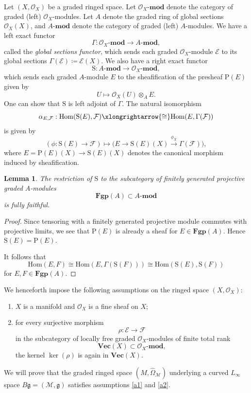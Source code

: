 \documentclass[12pt]{amsart}
\newtheorem{lem}[defn]{Lemma}
\numberwithin{equation}{section}
\theoremstyle{plain}
\newcommand{\fg}{\mathfrak{g}}
\newcommand{\sE}{\mathcal{E}}
\newcommand{\sF}{\mathcal{F}}
\newcommand{\sM}{\mathcal{M}}
\newcommand{\sO}{\mathcal{O}}
\newcommand{\Hom}{\mathrm{Hom}}
\newcommand{\sh}{\mathrm{S}}
\newcommand{\psh}{\mathrm{P}}
\newcommand{\wOmega}{\widehat{\Omega}}
\begin{document}
	Let $(X, \sO_X)$ be a graded ringed space. Let $\sO_X\text{-}\mathbf{mod}$ denote the category of graded (left) $\sO_X$-modules. Let $A$ denote the graded ring of global sections $\sO_X(X)$, and $A\text{-}\mathbf{mod}$ denote the category of graded (left) $A$-modules. We have a left exact functor
	\[
	\Gamma\colon \sO_X\text{-}\mathbf{mod} \longrightarrow A\text{-}\mathbf{mod},
	\]
	called the \emph{global sections functor}, which sends each graded $\sO_X$-module $\sE$ to its global sections $\Gamma(\sE)\coloneqq\sE(X)$. We also have a right exact functor
	\[
	\sh\colon A\text{-}\mathbf{mod} \longrightarrow \sO_X\text{-}\mathbf{mod},
	\]
	which sends each graded $A$-module $E$ to the sheafification of the presheaf $\psh(E)$ given by
	\[
	U \longmapsto \sO_X(U) \otimes_A E.
	\]
	One can show that $\sh$ is left adjoint of $\Gamma$. The natural isomorphism
	\[
	\alpha_{E,\sF}:
	\Hom(\sh(E),\sF)
	\xlongrightarrow{\cong}
	\Hom(E,\Gamma(\sF))
	\]
	is given by
	\[
	(\phi\colon \sh(E) \rightarrow \sF)\longmapsto \bigl(E \rightarrow \sh(E)(X) \xrightarrow{\phi_X} \Gamma(\sF)\bigr),
	\]
	where $E = \psh(E)(X) \rightarrow \sh(E)(X)$ denotes the canonical morphism induced by sheafification.
	
	\begin{lem}
		The restriction of $\sh$ to the subcategory of finitely generated projective graded $A$-modules 
		\[
		\mathbf{Fgp}(A) \subset A\text{-}\mathbf{mod}
		\]
		is fully faithful.
	\end{lem}
	\begin{proof}
		Since tensoring with a finitely generated projective module commutes with projective limits, we see that $\psh(E)$ is already a sheaf for $E \in \mathbf{Fgp}(A)$. Hence $\sh(E) = \psh(E)$. 
		
		It follows that
		\[
		\Hom(E, F) \cong \Hom(E, \Gamma(\sh(F))) \cong \Hom(\sh(E), \sh(F))
		\]
		for $E, F \in \mathbf{Fgp}(A)$.
	\end{proof} 
	
	We henceforth impose the following assumptions on the ringed space $(X,\sO_X)$:
	\begin{enumerate}[label=\textup{(\roman*)}]
		\item \label{a1} $X$ is a manifold and $\sO_X$ is a fine sheaf on $X$;
		\item \label{a2} for every surjective morphism
		\[
		\rho:\sE \longrightarrow \sF
		\]
		in the subcategory of locally free graded $\sO_X$-modules of finite total rank
		\[
		\mathbf{Vec}(X) \subset  \sO_X\text{-}\mathbf{mod},
		\]
		the kernel $\ker(\rho)$ is again in $\mathbf{Vec}(X)$.
	\end{enumerate}
	We will prove that the graded ringed space $(M, \wOmega_\sM)$ underlying a curved $L_\infty$ space $B\fg = (\sM, \fg)$ satisfies assumptions \ref{a1} and \ref{a2}.
	
\end{document}
